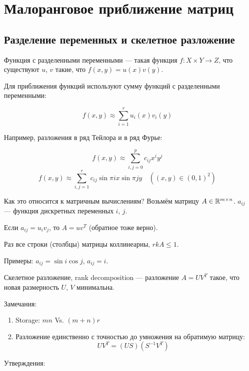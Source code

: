 \section{Малоранговое приближение матриц}

\subsection{Разделение переменных и скелетное разложение}

\begin{definition}
    Функция с разделенными переменными --- такая функция $f: X \times Y \to Z$,
    что существуют $u$, $v$ такие, что $f(x, y) = u(x) v(y)$.
\end{definition}

Для приближения функций используют сумму функций с разделенными переменными:

\[
    f(x, y) \approx \sum_{i = 1}^r u_i(x) v_i(y)
\]

Например, разложения в ряд Тейлора и в ряд Фурье:

\[
    f(x, y) \approx \sum_{i, j = 0}^p c_{ij} x^i y^j
\]
\[
    f(x, y) \approx \sum_{i, j = 1}^r c_{ij} \sin{\pi i x} \sin{\pi j y}
    \quad \left( (x, y) \in (0, 1)^2 \right)
\]

Как это относится к матричным вычислениям? Возьмём матрицу $A \in \mathbb{R}^{m\times n}$.
$a_{ij}$ --- функция дискретных переменных $i$, $j$.

Если $a_{ij} = u_i v_j$, то $A = u v^T$ (обратное тоже верно).

Раз все строки (столбцы) матрицы коллинеарны, $rk{A} \le 1$.

Примеры: $a_{ij} = \sin{i} \cos{j}$, $a_{ij} = i$.

\begin{definition}
    Скелетное разложение, rank decomposition --- разложение $A = U V^T$ такое,
    что новая размерность $U$, $V$ минимальна.
\end{definition}

Замечания:

\begin{enumerate}
    \item Storage: $m n$ Vs. $(m + n) r$
    \item Разложение единственно с точностью до умножения на обратимую матрицу:
        \[
            U V^T = (U S) (S^{-1} V^T)
        \]
\end{enumerate}

Утверждения:

